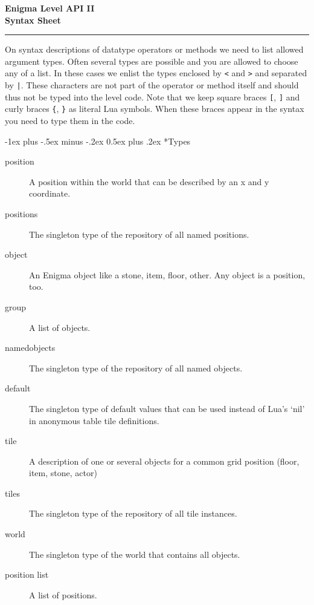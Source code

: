 \documentclass[10pt,landscape]{article}
\makeatletter
\renewcommand{\section}{\@startsection{section}{1}{0mm}%
                                {-1ex plus -.5ex minus -.2ex}%
                                {0.5ex plus .2ex}%
                                {\normalfont\large\bfseries}}
\makeatother
\begin{document}
\raggedright
\footnotesize
\begin{multicols}{3}
\setlength{\premulticols}{1pt}
\setlength{\postmulticols}{1pt}
\setlength{\multicolsep}{1pt}
\setlength{\columnsep}{2pt}

\begin{center}
\Large{\textbf{Enigma Level API II}} \\
\large{\textbf{Syntax Sheet}}
\end{center}

\begin{center}
\rule{0.6\linewidth}{0.25pt}
\end{center}

On syntax descriptions of datatype operators or methods we need to list allowed argument types.
Often several types are possible and you are allowed to choose any of a list. In these cases we
enlist the types enclosed by \verb!<! and \verb!>! and separated by \verb!|!. These
characters are not part of the operator or method itself and should thus not be typed into
the level code. Note that we keep square braces \verb![!, \verb!]! and curly braces \verb!{!, \verb!}!
as literal Lua symbols. When these braces appear in the syntax you need to type them in the code.

\section*{Types}

\begin{description}
  \item[position]A position within the world that can be described by an x and y coordinate.
  \item[positions]The singleton type of the repository of all named positions.
  \item[object]An Enigma object like a stone, item, floor, other. Any object is a position, too.
  \item[group]A list of objects.
  \item[namedobjects]The singleton type of the repository of all named objects.
  \item[default]The singleton type of default values that can be used instead of Lua’s ‘nil’ in anonymous table tile definitions.
  \item[tile]A description of one or several objects for a common grid position (floor, item, stone, actor)
  \item[tiles]The singleton type of the repository of all tile instances.
  \item[world]The singleton type of the world that contains all objects.
  \item[position list]A list of positions.
\end{description}


\end{multicols}
\end{document}
